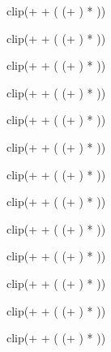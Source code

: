 \FPeval{\DndHistoryMod}
{clip(\DndSkillMod + \DndIntMod + (
	(\DndIsProficientHistory + \DndIsExpertiseHistory)
		 * \DndProficiencyMod))}

\FPeval{\DndInsightMod}
{clip(\DndSkillMod + \DndWisMod + (
	(\DndIsProficientInsight + \DndIsExpertiseInsight)
		 * \DndProficiencyMod))}

\FPeval{\DndIntimidationMod}
{clip(\DndSkillMod + \DndChaMod + (
	(\DndIsProficientIntimidation + \DndIsExpertiseIntimidation)
		 * \DndProficiencyMod))}

\FPeval{\DndInvestigationMod}
{clip(\DndSkillMod + \DndIntMod + (
	(\DndIsProficientInvestigation + \DndIsExpertiseInvestigation)
		 * \DndProficiencyMod))}

\FPeval{\DndMedicineMod}
{clip(\DndSkillMod + \DndWisMod + (
	(\DndIsProficientMedicine + \DndIsExpertiseMedicine)
		 * \DndProficiencyMod))}

\FPeval{\DndNatureMod}
{clip(\DndSkillMod + \DndIntMod + (
	(\DndIsProficientNature + \DndIsExpertiseNature)
		 * \DndProficiencyMod))}

\FPeval{\DndPerceptionMod}
{clip(\DndSkillMod + \DndWisMod + (
	(\DndIsProficientPerception + \DndIsExpertisePerception)
		 * \DndProficiencyMod))}

\FPeval{\DndPerformanceMod}
{clip(\DndSkillMod + \DndChaMod + (
	(\DndIsProficientPerformance + \DndIsExpertisePerformance)
		 * \DndProficiencyMod))}

\FPeval{\DndPersuasionMod}
{clip(\DndSkillMod + \DndChaMod + (
	(\DndIsProficientPersuasion + \DndIsExpertisePersuasion)
		 * \DndProficiencyMod))}

\FPeval{\DndReligionMod}
{clip(\DndSkillMod + \DndIntMod + (
	(\DndIsProficientReligion + \DndIsExpertiseReligion)
		 * \DndProficiencyMod))}

\FPeval{\DndSlightOfHandMod}
{clip(\DndSkillMod + \DndDexMod + (
	(\DndIsProficientSlightOfHand + \DndIsExpertiseSlightOfHand)
		 * \DndProficiencyMod))}

\FPeval{\DndStealthMod}
{clip(\DndSkillMod + \DndDexMod + (
	(\DndIsProficientStealth + \DndIsExpertiseStealth)
		 * \DndProficiencyMod))}

\FPeval{\DndSurvivalMod}
{clip(\DndSkillMod + \DndWisMod + (
	(\DndIsProficientSurvival + \DndIsExpertiseSurvival)
		 * \DndProficiencyMod))}




\ifthenelse{\isundefined{\DndArcaneTricksterLevel}}
	{}{}
